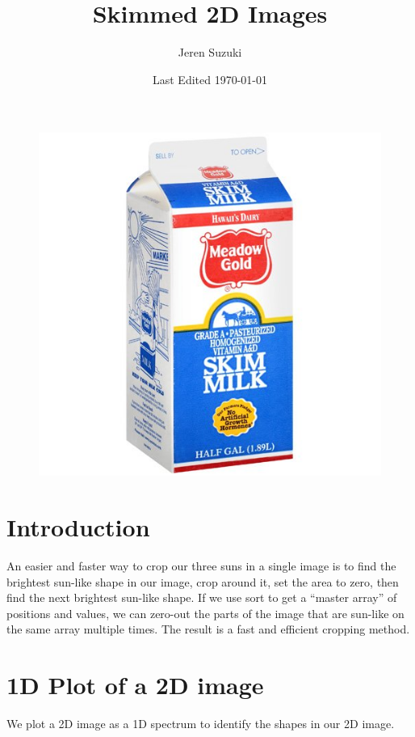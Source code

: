 \documentclass[10pt]{article}
\title{Skimmed 2D Images}
\author{Jeren Suzuki}
\date{Last Edited \today}
\begin{document}
\maketitle

\begin{figure}[!ht]
    \centering
    \includegraphics[width=.9\textwidth]{plots_tables_images/skimmilk.jpg}    
\end{figure}

\tableofcontents
\newpage
{}

\section{Introduction} %
\label{sec:introduction}
An easier and faster way to crop our three suns in a single image is to find the brightest sun-like shape in our image, crop around it, set the area to zero, then find the next brightest sun-like shape. If we use sort to get a ``master array'' of positions and values, we can zero-out the parts of the image that are sun-like on the same array multiple times. The result is a fast and efficient cropping method.


\section{1D Plot of a 2D image} %
\label{sec:1d_plot_of_a_2d_image}
We plot a 2D image as a 1D spectrum to identify the shapes in our 2D image.
\end{document}
